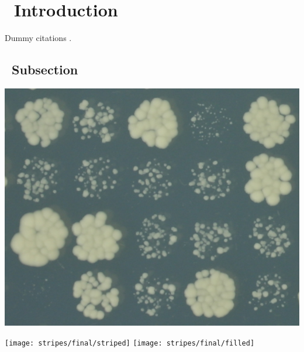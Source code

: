 \graphicspath{{images/}}

\section{\thesection~Introduction}
\label{sec:introduction}
Dummy \citet{Lawless2010} citations \citep{Heydari2016} \citep{Addinall2008}.

\subsection{\thesubsection~Subsection}

\begin{Figure}
  \centering
  \includegraphics[width=\linewidth]{p15_section/p15_section}
  \label{fig:p15_section}
\end{Figure}


\begin{Figure}
  \centering
  \texttt{[image: stripes/final/striped]}
  \texttt{[image: stripes/final/filled]}
  \label{fig:stripes_images}
\end{Figure}



